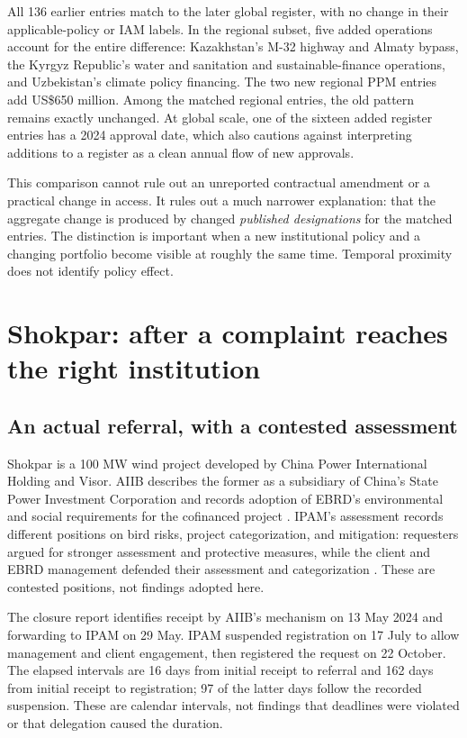 \documentclass[11pt,a4paper]{article}
\newcommand{\USD}{US\$}
\begin{document}
All 136 earlier entries match to the later global register, with no change in their applicable-policy or IAM labels. In the regional subset, five added operations account for the entire difference: Kazakhstan's M-32 highway and Almaty bypass, the Kyrgyz Republic's water and sanitation and sustainable-finance operations, and Uzbekistan's climate policy financing. The two new regional PPM entries add \USD650 million. Among the matched regional entries, the old pattern remains exactly unchanged. At global scale, one of the sixteen added register entries has a 2024 approval date, which also cautions against interpreting additions to a register as a clean annual flow of new approvals.

This comparison cannot rule out an unreported contractual amendment or a practical change in access. It rules out a much narrower explanation: that the aggregate change is produced by changed \emph{published designations} for the matched entries. The distinction is important when a new institutional policy and a changing portfolio become visible at roughly the same time. Temporal proximity does not identify policy effect.

\section{Shokpar: after a complaint reaches the right institution}
\subsection{An actual referral, with a contested assessment}
Shokpar is a 100 MW wind project developed by China Power International Holding and Visor. AIIB describes the former as a subsidiary of China's State Power Investment Corporation and records adoption of EBRD's environmental and social requirements for the cofinanced project \citep{shokparproject}. IPAM's assessment records different positions on bird risks, project categorization, and mitigation: requesters argued for stronger assessment and protective measures, while the client and EBRD management defended their assessment and categorization \citep[pp.~8--11]{shokparassessment}. These are contested positions, not findings adopted here.

The closure report identifies receipt by AIIB's mechanism on 13 May 2024 and forwarding to IPAM on 29 May. IPAM suspended registration on 17 July to allow management and client engagement, then registered the request on 22 October. The elapsed intervals are 16 days from initial receipt to referral and 162 days from initial receipt to registration; 97 of the latter days follow the recorded suspension. These are calendar intervals, not findings that deadlines were violated or that delegation caused the duration.
\end{document}
